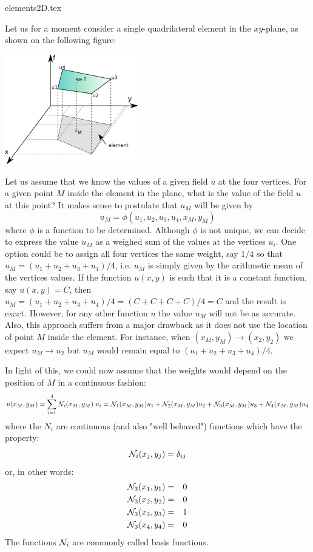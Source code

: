 \begin{flushright} {\tiny {\color{gray} elements2D.tex}} \end{flushright}


Let us for a moment consider a single quadrilateral element in the $xy$-plane, 
as shown on the following figure:
\begin{center}
\includegraphics[width=5.8cm]{images/shape}
\end{center}
Let us assume that we know the values of a given field $u$ at the four vertices.
For a given point $M$ inside the element in the plane, what is the value of the 
field $u$ at this point?
It makes sense to postulate that $u_M$ will be given  by 
\[
u_M= \phi(u_1,u_2,u_3,u_4,x_M,y_M) 
\]
where $\phi$ is a function to be determined. Although $\phi$ is not unique, we can 
decide to express the value $u_M$ as a weighed sum of the values at the vertices $u_i$.
One option could be to assign all four vertices the same weight, say $1/4$ so that 
$u_M=(u_1+u_2+u_3+u_4)/4$, i.e. $u_M$ is simply given by the arithmetic mean 
of the vertices values. 
If the function $u(x,y)$ is such that it is a constant function, say $u(x,y)=C$, 
then $u_M=(u_1+u_2+u_3+u_4)/4=(C+C+C+C)/4=C$ and the result is exact.
However, for any other function $u$ the value $u_M$ will not be as accurate.
Also, this approach suffers from a major drawback as it does
not use the location of point $M$ inside the element. For instance, when 
$(x_M,y_M) \rightarrow (x_2,y_2)$ we expect $u_M \rightarrow u_2$ but $u_M$ would 
remain equal to $(u_1+u_2+u_3+u_4)/4$.

In light of this, we could now assume that the weights would depend on the position 
of $M$ in a continuous fashion:
\begin{equation}
u(x_M,y_M) = \sum_{i=1}^4 {\mathcal{N}}_i(x_M,y_M)\;  u_i
= {\mathcal{N}}_1(x_M,y_M) u_1 + {\mathcal{N}}_2(x_M,y_M) u_2 + {\mathcal{N}}_3(x_M,y_M) u_3 + {\mathcal{N}}_4(x_M,y_M) u_4 
\end{equation}
where the $N_i$ are continuous (and also "well behaved") functions which have the property:
\[
{\mathcal{N}}_i(x_j,y_j)=\delta_{ij}
\]
or, in other words: 
\begin{eqnarray}
{\mathcal{N}}_3(x_1,y_1) &=& 0 \nonumber\\
{\mathcal{N}}_3(x_2,y_2) &=& 0 \nonumber\\
{\mathcal{N}}_3(x_3,y_3) &=& 1 \nonumber\\
{\mathcal{N}}_3(x_4,y_4) &=& 0 
\end{eqnarray}
The functions ${\mathcal{N}}_i$ are commonly called basis functions. 

